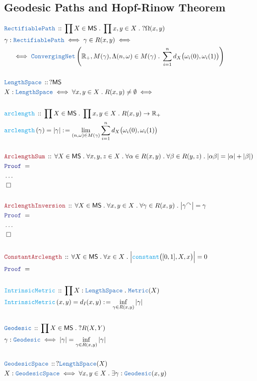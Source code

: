 \documentclass[12pt]{scrartcl}
\newcommand{\TYPE}[1]{\textcolor{NavyBlue}{\mathtt{#1}}}
\newcommand{\FUNC}[1]{\textcolor{Cerulean}{\mathtt{#1}}}
\newcommand{\LOGIC}[1]{\textcolor{Blue}{\mathtt{#1}}}
\newcommand{\THM}[1]{\textcolor{Maroon}{\mathtt{#1}}}
\renewcommand{\.}{\; . \;}
\newcommand{\de}{: \kern 0.1pc =}
\newcommand{\Act}[1]{\left( #1 \right)}
\newcommand{\Theorem}[2]{& \THM{#1} \, :: \, #2 \\ & \Proof = \\ }
\newcommand{\DeclareType}[2]{& \TYPE{#1} \, :: \, #2 \\}
\newcommand{\DefineType}[3]{& #1 : \TYPE{#2} \iff #3 \\}
\newcommand{\DefineNamedType}[4]{& #1 : \TYPE{#2} \iff #3 \iff #4 \\}
\newcommand{\DeclareFunc}[2]{& \FUNC{#1} \, :: \, #2 \\}
\newcommand{\DefineNamedFunc}[4]{&  \FUNC{#1}\Act{#2} = #3 \de #4 \\}
\newcommand{\NewLine}{\\ & \kern 1pc}
\newcommand{\Page}[1]{ \begin{align*} #1 \end{align*}   }
\newcommand{\NoProof}{ & \ldots \\ \EndProof}
\newcommand{\Reals}{\mathbb{R} }
\newcommand{\QED}{\; \square}
\newcommand{\EndProof}{& \QED \\}
\newcommand{\Proof}{\LOGIC{Proof} \; }
\newcommand{\MS}{\mathsf{MS}}
\begin{document}
\subsection{Geodesic Paths and Hopf-Rinow Theorem}
\Page{
	\DeclareType{RectifiablePath}{\prod X \in \MS \. \prod x,y \in X \. ?\Omega(x,y)  }
	\DefineNamedType{\gamma}{RectifiablePath}{\gamma \in R(x,y) }
	{ \NewLine \iff \TYPE{ConvergingNet}\left( \Reals_+, M(\gamma) , \Lambda (n,\omega) \in M(\gamma) \. \sum^n_{i=1} d_X\big(\omega_i(0),\omega_i(1)\big) \right)}
	\\
	\DeclareType{LengthSpace}{?\MS}
	\DefineNamedType{X}{LengthSpace}{\forall x,y \in X \. R(x,y) \neq \emptyset }
	\\
	\DeclareFunc{arclength}{\prod X \in \MS \. \prod x,y \in X \. R(x,y) \to \Reals_{+}}
	\DefineNamedFunc{arclength}{\gamma}{|\gamma|}{\lim_{(n,\omega)\in M(\gamma)} \sum^n_{i=1} d_X\big(\omega_i(0),\omega_i(1)\big)}
	\\
	\Theorem{ArclengthSum}{\forall X \in \MS \. \forall x,y,z \in X \. \forall \alpha \in R(x,y) \. \forall \beta \in R(y,z) \. |\alpha\beta| = |\alpha| + |\beta| )}
	\NoProof
	\\
	\Theorem{ArclengthInversion}{\forall X \in \MS \. \forall x,y \in X \.  \forall \gamma \in R(x,y) \. \big|\gamma^\curvearrowright \big| = \gamma}
	\NoProof
	\\
	\Theorem{ConstantArclength}{\forall X \in \MS \. \forall x \in X \. \Big| \FUNC{constant}\big([0,1],X,  x \big)  \Big| = 0}
	\\
	\DeclareFunc{IntrinsicMetric}{\prod X : \TYPE{LengthSpace} \. \TYPE{Metric}(X)}
	\DefineNamedFunc{IntrinsicMetric}{x,y}{d_I(x,y)}{\inf_{\gamma \in R(x,y)} |\gamma|}
	\\
	\DeclareType{Geodesic}{\prod X \in \MS \. ?R(X,Y)}
	\DefineType{\gamma}{Geodesic}{ |\gamma| = \inf_{\gamma \in R(x,y)} |\gamma|}
	\\
	\DeclareType{GeodesicSpace}{ ?\TYPE{LengthSpace}(X) }
	\DefineType{X}{GeodesicSpace}{\forall x,y \in X \. \exists \gamma : \TYPE{Geodesic}(x,y)}
}
\newpage
\end{document}
